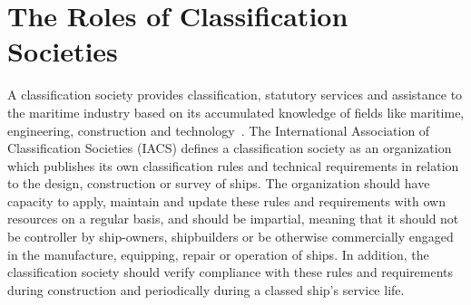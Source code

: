 % 

\section{The Roles of Classification Societies}
A classification society provides classification, statutory services and assistance to the maritime industry based on its accumulated knowledge of fields like
maritime, engineering, construction and technology~\citep{Hormann2006}.
The International Association of Classification Societies (IACS) defines a classification society as an organization which
publishes its own classification rules and technical requirements in relation to the design, construction or survey of ships. 
The organization should have capacity to apply, maintain and update these rules and requirements with own resources on a regular basis, and should 
be impartial, meaning that it should not be controller by ship-owners, shipbuilders or be otherwise commercially engaged in the manufacture, 
equipping, repair or operation of ships.
In addition, the classification society should verify compliance with these rules and requirements during construction and periodically during a classed
ship's service life. 

